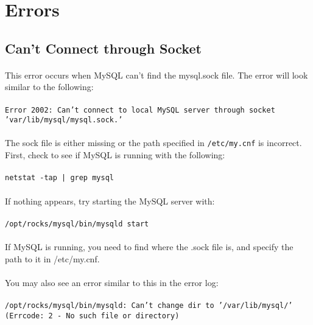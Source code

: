 \documentclass[12pt]{article}
\begin{document}
\section{Errors}
\subsection{Can't Connect through Socket}
\paragraph{} This error occurs when MySQL can't find the mysql.sock file. The error will look similar to the following: 
\paragraph{}{\tt Error 2002: Can't connect to local MySQL server through socket 'var/lib/mysql/mysql.sock.'}
\paragraph{}The sock file is either missing or the path specified in {\tt/etc/my.cnf} is incorrect. First, check to see if MySQL is running with the following: 
\paragraph{}{\tt netstat -tap | grep mysql}
\paragraph{}If nothing appears, try starting the MySQL server with:
\paragraph{}{\tt /opt/rocks/mysql/bin/mysqld start}
\paragraph{}If MySQL is running, you need to find where the .sock file is, and specify the path to it in /etc/my.cnf.
\paragraph{}You may also see an error similar to this in the error log:
\paragraph{}{\tt /opt/rocks/mysql/bin/mysqld: Can't change dir to '/var/lib/mysql/' (Errcode: 2 - No such file or directory) }
\end{document}
